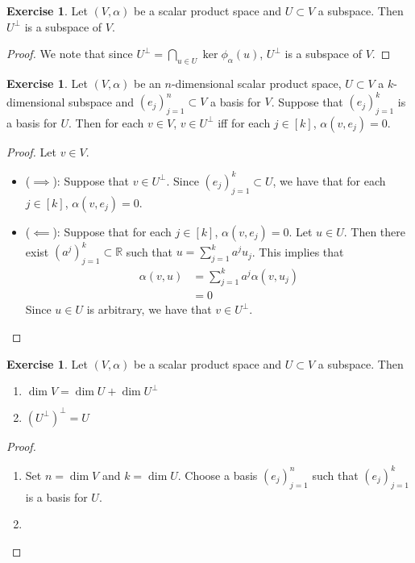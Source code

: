 \documentclass{book}
\theoremstyle{definition}
\newtheorem{ex}[definition]{Exercise}
\newcommand{\al}{\alpha}
\newcommand{\R}{\mathbb{R}}
\DeclareMathOperator*{\0}{\mbf{0}}
\DeclareMathOperator*{\1}{\mbf{1}}
\begin{document}
	\begin{ex}
		Let $(V, \al)$ be a scalar product space and $U \subset V$ a subspace. Then
		$U^{\perp}$ is a subspace of $V$.
	\end{ex}

	\begin{proof}
		We note that since $U^{\perp} = \bigcap_{u \in U} \ker \phi_{\al}(u)$, $U^{\perp}$ is a subspace of $V$.
	\end{proof}

	\begin{ex}
		Let $(V, \al)$ be an $n$-dimensional scalar product space, $U \subset V$ a $k$-dimensional subspace and $(e_j)_{j=1}^n \subset V$ a basis for $V$. Suppose that $(e_j)_{j=1}^k$ is a basis for $U$. Then for each $v \in V$, $v \in U^{\perp}$ iff for each $j \in [k]$, $\al(v, e_j) = 0$. 
	\end{ex}

	\begin{proof} Let $v \in V$.
		\begin{itemize}
			\item ($\implies$): Suppose that $v \in U^{\perp}$. Since $(e_j)_{j=1}^k \subset U$, we have that for each $j \in [k]$, $\al(v, e_j) = 0$. 
			\item ($\impliedby$): Suppose that for each $j \in [k]$, $\al(v, e_j) = 0$. Let $u \in U$. Then there exist $(a^j)_{j=1}^k \subset \R$ such that $u = \sum\limits_{j=1}^k a^j u_j$. This implies that 
			\begin{align*}
				\al(v, u) 
				& = \sum_{j=1}^k a^j \al (v, u_j) \\
				& = 0
			\end{align*}
			Since $u \in U$ is arbitrary, we have that $v \in U^{\perp}$. 
		\end{itemize}
	\end{proof}

	\begin{ex}
		Let $(V, \al)$ be a scalar product space and $U \subset V$ a subspace. Then
		\begin{enumerate}
			\item $\dim V = \dim U + \dim U^{\perp}$
			\item $(U^{\perp})^{\perp} = U$
		\end{enumerate}
	\end{ex}

	\begin{proof}
		\begin{enumerate}
			\item Set $n = \dim V$ and $k = \dim U$. Choose a basis $(e_j)_{j=1}^n$ such that $(e_j)_{j=1}^k$ is a basis for $U$. 
			\item 
		\end{enumerate}
	\end{proof}	
	
\end{document}
